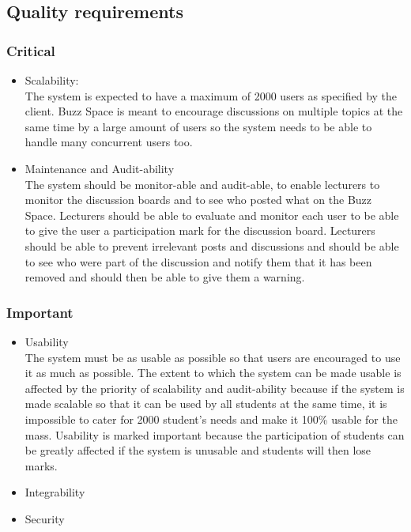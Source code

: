 
\subsection{Quality requirements}
	\subsubsection{Critical}
		\begin{itemize}
			\item Scalability: \\
			The system is expected to have a maximum of 2000 users as specified by the client. Buzz Space is meant to encourage discussions on multiple topics at the same time by a large amount of users so the system needs to be able to handle many concurrent users too.
			\item Maintenance and Audit-ability \\
			The system should be monitor-able and audit-able, to enable lecturers to monitor the discussion boards and to see who posted what on the Buzz Space. Lecturers should be able to evaluate and monitor each user to be able to give the user a participation mark for the discussion board. Lecturers should be able to prevent irrelevant posts and discussions and should be able to see who were part of the discussion and notify them that it has been removed and should then be able to give them a warning.
		\end{itemize}
	\subsubsection{Important}
		\begin{itemize}
			\item Usability \\
			The system must be as usable as possible so that users are encouraged to use it as much as possible. The extent to which the system can be made usable is affected by the priority of scalability and audit-ability because if the system is made scalable so that it can be used by all students at the same time, it is impossible to cater for 2000 student's needs and make it 100\% usable for the mass. Usability is marked important because the participation of students can be greatly affected if the system is unusable and students will then lose marks.

			\item Integrability
			\item Security
		\end{itemize}